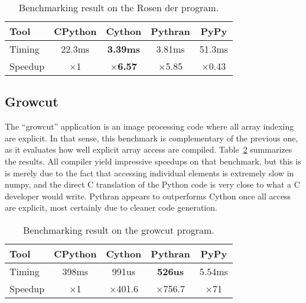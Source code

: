 \documentclass[10pt, onecolumn, preprint]{sigplanconf}
\begin{document}
\begin{table}
    \centering

    \begin{tabular}{|l|c|c|c|c|}
        \hline
     Tool    &  CPython    &   Cython     &     Pythran   &  PyPy \\
    \hline
    Timing  &  22.3ms   &   \textbf{3.39ms}     &    3.81ms &  51.3ms  \\
    \hline
    Speedup &  $\times$1         &    \textbf{$\times$6.57}      &    $\times$5.85   &  $\times$0.43    \\
    \hline
\end{tabular}
\caption{Benchmarking result on the Rosen der program.}
\label{tbl:rosen}

\end{table}

\subsection{Growcut}

The ``growcut'' application is an image processing code where all array indexing
are explicit. In that sense, this benchmark is complementary of the previous
one, as it evaluates how well explicit array access are compiled.
Table~\ref{tbl:growcut} summarizes the results. All compiler yield impressive
speedups on that benchmark, but this is is merely due to the fact that
accessing individual elements is extremely slow in numpy, and the direct C
translation of the Python code is very close to what a C developer would write.
Pythran appears to outperforms Cython once all access are explicit, most
certainly due to cleaner code generation.


\begin{table}
    \centering

    \begin{tabular}{|l|c|c|c|c|}
        \hline
     Tool    &  CPython    &   Cython     &     Pythran   &  PyPy \\
    \hline
    Timing  &  398ms   &   991us     &    \textbf{526us} &  5.54ms  \\
    \hline
    Speedup &  $\times$1         &    $\times$401.6      &    $\times$756.7   &  $\times$71    \\
    \hline
\end{tabular}
\caption{Benchmarking result on the growcut program.}
\label{tbl:growcut}

\end{table}
\end{document}
